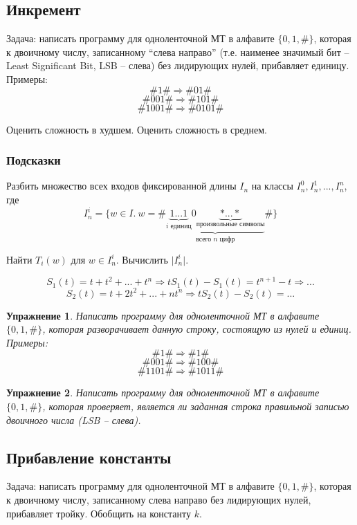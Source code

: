 \documentclass[a4paper, 12pt]{extarticle}
\newtheorem*{homework}{Упражнение}
\begin{document}
\subsection*{Инкремент}
Задача: написать программу для одноленточной МТ в алфавите $\{0, 1, \#\}$, которая к двоичному числу, записанному ``слева направо'' 
(т.е. наименее значимый бит -- Least Significant Bit, LSB -- слева) без лидирующих нулей, прибавляет единицу. Примеры:
$$\#1\# \Rightarrow \#01\#$$
$$\#001\# \Rightarrow \#101\#$$
$$\#1001\# \Rightarrow \#0101\#$$

Оценить сложность в худшем. Оценить сложность в среднем.

\subsubsection*{Подсказки}
Разбить множество всех входов фиксированной длины $I_n$ на классы $I^{0}_n, I^{1}_n, ..., I^{n}_n$, где
$$I^{i}_n = \{ w \in I. \ w = \# \underbrace{\underbrace{1...1}_{\text{$i$ единиц}}0\underbrace{*...*}_{\text{произвольные символы}}}_{\text{всего $n$ цифр}}\#\}$$

Найти $T_i(w)$ для $w \in I^{i}_n$. Вычислить $\vert{I^{i}_n}\rvert$. 

$$S_1(t) = t + t^2 + ... + t^n \Rightarrow tS_1(t) - S_1(t) = t^{n+1} - t \Rightarrow ...$$
$$S_2(t) = t + 2t^2 + ... + nt^n \Rightarrow tS_2(t) - S_2(t) = ...$$

\begin{homework}
 Написать программу для одноленточной МТ в алфавите $\{0, 1, \#\}$, которая разворачивает данную строку, состоящую из нулей и единиц.
 Примеры:
$$\#1\# \Rightarrow \#1\#$$
$$\#001\# \Rightarrow \#100\#$$
$$\#1101\# \Rightarrow \#1011\#$$
\end{homework}

\begin{homework}
 Написать программу для одноленточной МТ в алфавите $\{0, 1, \#\}$, которая проверяет, является ли заданная строка
 правильной записью двоичного числа (LSB -- слева).
\end{homework}

\subsection*{Прибавление константы}
Задача: написать программу для одноленточной МТ в алфавите $\{0, 1, \#\}$, которая к двоичному числу, записанному слева направо
без лидирующих нулей, прибавляет тройку. Обобщить на константу $k$.
\end{document}
